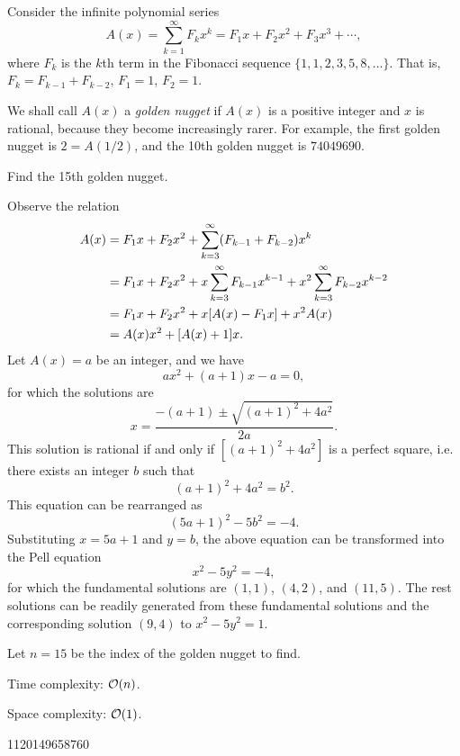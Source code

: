 




Consider the infinite polynomial series
\[
A(x) = \sum_{k=1}^{\infty} F_k x^k = F_1 x + F_2 x^2 + F_3 x^3 + \cdots ,
\]
where $F_k$ is the $k$th term in the Fibonacci sequence $\{ 1, 1, 2, 3, 5, 8, \ldots \}$. That is, $F_k = F_{k-1} + F_{k-2}$, $F_1 = 1$, $F_2 = 1$.

We shall call $A(x)$ a \emph{golden nugget} if $A(x)$ is a positive integer and $x$ is rational, because they become increasingly rarer. For example, the first golden nugget is $2 = A(1/2)$, and the 10th golden nugget is $74049690$.

Find the 15th golden nugget.

\solution

Observe the relation
\begin{align}
A(x) &= F_1 x + F_2 x^2 + \sum_{k=3}^{\infty} (F_{k-1}+F_{k-2}) x^k \notag \\
&= F_1 x + F_2 x^2 + x \sum_{k=3}^{\infty} F_{k-1} x^{k-1} + x^2 \sum_{k=3}^{\infty} F_{k-2} x^{k-2} \notag \\
&= F_1 x + F_2 x^2 + x[A(x) - F_1 x] + x^2 A(x)  \notag \\
&= A(x) x^2 + [A(x)+1] x . \notag
\end{align}
Let $A(x) = a$ be an integer, and we have
\[
a x^2 + (a+1) x - a = 0 ,
\]
for which the solutions are
\[
x = \frac{-(a+1) \pm \sqrt{(a+1)^2 + 4a^2} }{2a} .
\]
This solution is rational if and only if $[(a+1)^2+4a^2]$ is a perfect square, i.e. there exists an integer $b$ such that
\[
(a+1)^2 + 4a^2 = b^2 .
\]
This equation can be rearranged as
\[
(5a+1)^2 - 5b^2 = -4.
\]
Substituting $x = 5a+1$ and $y = b$, the above equation can be transformed into the Pell equation
\[
x^2 - 5 y^2 = -4,
\]
for which the fundamental solutions are $(1,1)$, $(4,2)$, and $(11,5)$. The rest solutions can be readily generated from these fundamental solutions and the corresponding solution $(9, 4)$ to $x^2 - 5 y^2 = 1$.

\complexity

Let $n = 15$ be the index of the golden nugget to find.

Time complexity: $\mathcal{O}(n)$.

Space complexity: $\mathcal{O}(1)$.

\answer

1120149658760


